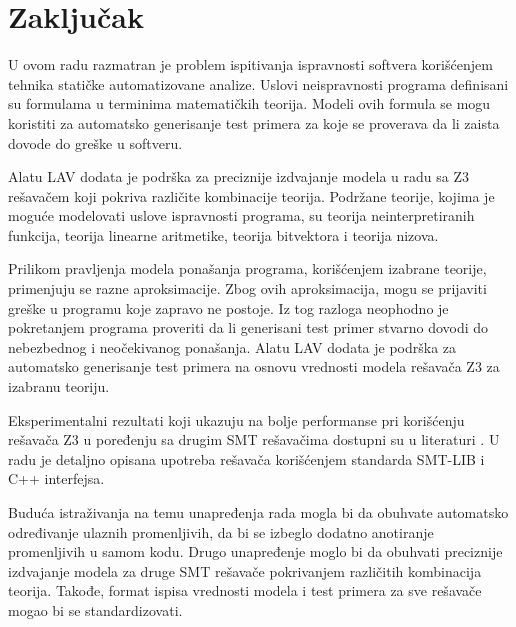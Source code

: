 \documentclass[12pt,oneside]{memoir}
\begin{document}
\chapter{Zaključak} \label{zakljucak}
U ovom radu razmatran je problem ispitivanja ispravnosti softvera korišćenjem tehnika statičke automatizovane analize. 
Uslovi neispravnosti programa definisani su formulama u terminima matematičkih teorija. Modeli ovih formula se mogu koristiti za automatsko generisanje test primera za koje se proverava da li zaista dovode do greške u softveru.
\par
Alatu LAV dodata je podrška za preciznije izdvajanje modela u radu sa Z3 rešavačem
koji pokriva različite kombinacije teorija. Podržane teorije, kojima je moguće modelovati uslove ispravnosti programa, su teorija neinterpretiranih funkcija, teorija linearne aritmetike,
teorija bitvektora i teorija nizova.

Prilikom pravljenja modela ponašanja programa, korišćenjem izabrane teorije,
primenjuju se razne aproksimacije. 
Zbog ovih aproksimacija, mogu se prijaviti greške u programu koje zapravo ne postoje. Iz tog razloga neophodno je pokretanjem
programa proveriti da li generisani test primer stvarno dovodi do nebezbednog i
neočekivanog ponašanja. Alatu LAV dodata je podrška za automatsko
generisanje test primera na osnovu vrednosti modela rešavača Z3 za izabranu
teoriju.
 
Eksperimentalni rezultati koji ukazuju na bolje performanse pri korišćenju rešavača Z3 u poređenju sa drugim SMT rešavačima dostupni su u literaturi \cite{z3improvements}. U radu je detaljno opisana upotreba rešavača korišćenjem standarda SMT-LIB i C++ interfejsa.

Buduća istraživanja na temu unapređenja rada mogla bi da obuhvate automatsko određivanje ulaznih promenljivih, da bi se izbeglo dodatno anotiranje promenljivih u samom kodu. Drugo unapređenje moglo bi da obuhvati preciznije izdvajanje modela za druge SMT rešavače pokrivanjem različitih kombinacija teorija. Takođe, format ispisa vrednosti modela i test primera za sve rešavače mogao bi se standardizovati. 


\literatura

\backmatter

\end{document}
